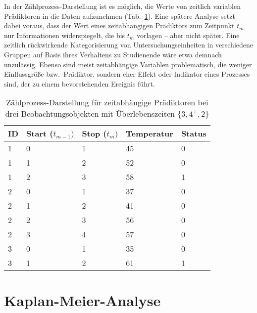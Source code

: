 In der Zählprozess-Darstellung ist es möglich, die Werte von zeitlich variablen Prädiktoren in die Daten aufzunehmen (Tab.\ \ref{tab:survTimeDep}). Eine spätere Analyse setzt dabei voraus, dass der Wert eines zeitabhängigen Prädiktors zum Zeitpunkt $t_{m}$ nur Informationen widerspiegelt, die bis $t_{m}$ vorlagen -- aber nicht später. Eine zeitlich rückwirkende Kategorisierung von Untersuchungseinheiten in verschiedene Gruppen auf Basis ihres Verhaltens zu Studienende wäre etwa demnach unzulässig. Ebenso sind meist zeitabhängige Variablen problematisch, die weniger Einflussgröße bzw.\ Prädiktor, sondern eher Effekt oder Indikator eines Prozesses sind, der zu einem bevorstehenden Ereignis führt.

\begin{table}[ht]
\centering
\caption{Zählprozess-Darstellung für zeitabhängige Prädiktoren bei drei Beobachtungsobjekten mit Überlebenszeiten $\{3, 4^{+}, 2\}$}
\label{tab:survTimeDep}
\begin{tabular}{lllll}
\hline
ID & \sffamily Start ($t_{m-1})$ & \sffamily Stop ($t_{m})$ & \sffamily Temperatur & \sffamily Status\\\hline\hline
 1 & 0       & 1       & 45                   & 0 \\
 1 & 1       & 2       & 52                   & 0 \\
 1 & 2       & 3       & 58                   & 1 \\
 2 & 0       & 1       & 37                   & 0 \\
 2 & 1       & 2       & 41                   & 0 \\
 2 & 2       & 3       & 56                   & 0 \\
 2 & 3       & 4       & 57                   & 0 \\
 3 & 0       & 1       & 35                   & 0 \\
 3 & 1       & 2       & 61                   & 1 \\\hline
\end{tabular}
\end{table}

\section{Kaplan-Meier-Analyse}
\label{sec:survKM}

